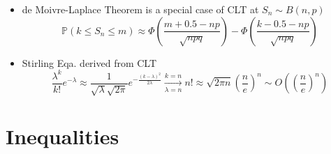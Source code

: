 \begin{itemize}[topsep=2pt,itemsep=0pt]
\begin{proof}
    Define $ Z=\dfrac{X-\mu }{\sigma } $ The taylor series of $ \phi _Z(t) $ at $ t=0 $ yields:
    \begin{align}
        \phi _Z(t)=1-\dfrac{t^2}{2}+o(t^2) 
    \end{align}
    The characteristic function of mean $ \displaystyle\bar{Z}:=\dfrac{1}{n}\sum_{i=1}^nZ_i=\dfrac{1}{n}\sum_{i=1}^n\dfrac{X_i-\mu }{\sigma } $ w.r.t. $ X_i $ i.i.d. $ \sim f_X(x) $
    \begin{align}
        \phi _{\bar{Z}}(t)=\mathbb{E}\left[ e^{it\bar{Z}} \right]=&\left[\phi _{Z}(\dfrac{t}{n})\right]^n=\left[1-\dfrac{t^2}{2n^2}\right] ^n 
    \end{align}
    with $ n\to\infty $ limit:\footnote{Note: if use characteristic function of $ X_i $ directly, notice that
    \begin{align}
        n\log\left(1+ \dfrac{at}{n}-\dfrac{bt^2}{2n^2}\right)= at -\left(b+a^2\right)\dfrac{t^2}{2n}+\mathcal{O}(\dfrac{1}{n^2})
    \end{align}
    using the taylor series of $ \log(1+\xi ) $ at $ \xi =0 $.
    }
    \begin{align}
        \lim_{n\to\infty}\phi _{\bar{Z}}(t)=&\lim_{n\to\infty} \left[1-\dfrac{1}{n}\dfrac{t^2}{2n}\right] ^n=e^{-\frac{t^2}{2n}} \Rightarrow \bar{Z}=\dfrac{\bar{X}-\mu }{\sigma }\xrightarrow[]{\mathrm{d}} N(0,\dfrac{1}{n})
    \end{align}

\end{proof}

\item de Moivre-Laplace Theorem is a special case of CLT at $ S_n\sim B (n,p) $
\begin{equation}    \mathbb{P}(k\leq S_n\leq m)\approx \Phi(\frac{m+0.5-np}{\sqrt{npq}})-\Phi(\frac{k-0.5-np}{\sqrt{npq}})
\end{equation}
\item Stirling Eqa. derived from CLT
\begin{equation}    \frac{\lambda^k}{k!}e^{-\lambda}\approx \frac{1}{\sqrt{\lambda}\sqrt{2\pi}}e^{-\frac{(k-\lambda)^2}{2\lambda}}\xrightarrow[\lambda=n]{k=n}n!\approx\sqrt{2\pi n}(\frac{n}{e})^n\sim O\left((\dfrac{n}{e})^n\right)
\end{equation}

\end{itemize}


\section{Inequalities}\label{SubSectionUsefulInequality}
    
